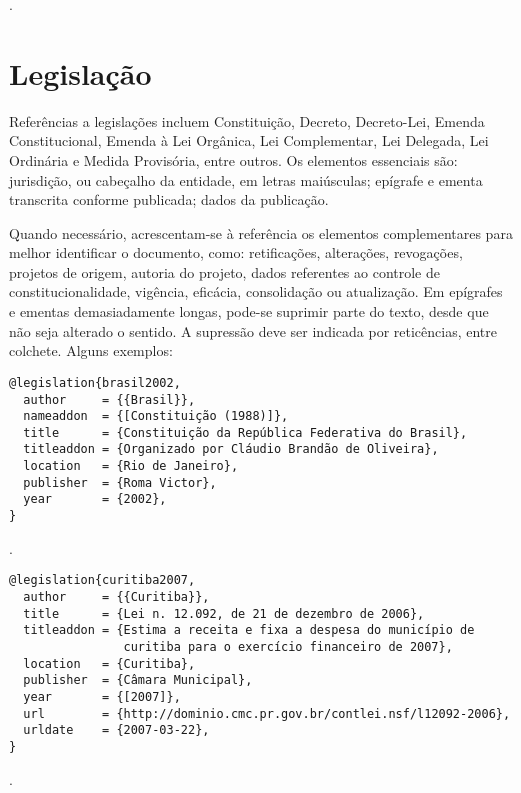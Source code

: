 \noindent
{}.

\section{Legislação}

Referências a legislações incluem Constituição, Decreto, Decreto-Lei, Emenda Constitucional, Emenda à Lei Orgânica, Lei Complementar, Lei Delegada, Lei Ordinária e Medida Provisória, entre outros.
Os elementos essenciais são: jurisdição, ou cabeçalho da entidade, em letras maiúsculas; epígrafe e ementa transcrita conforme publicada; dados da publicação.

Quando necessário, acrescentam-se à referência os elementos complementares para melhor identificar o documento, como: retificações, alterações, revogações, projetos de origem,
autoria do projeto, dados referentes ao controle de constitucionalidade, vigência, eficácia, consolidação ou atualização.
Em epígrafes e ementas demasiadamente longas, pode-se suprimir parte do texto, desde que não seja alterado o sentido. A supressão deve ser indicada por reticências, entre colchete.
Alguns exemplos:

\vspace*{1em}

\begin{Verbatim}[frame=single]
@legislation{brasil2002,
  author     = {{Brasil}},
  nameaddon  = {[Constituição (1988)]},
  title      = {Constituição da República Federativa do Brasil},
  titleaddon = {Organizado por Cláudio Brandão de Oliveira},
  location   = {Rio de Janeiro},
  publisher  = {Roma Victor},
  year       = {2002},
}
\end{Verbatim}

\noindent
{}.

\vspace*{1em}

\begin{Verbatim}[frame=single]
@legislation{curitiba2007,
  author     = {{Curitiba}},
  title      = {Lei n. 12.092, de 21 de dezembro de 2006},
  titleaddon = {Estima a receita e fixa a despesa do município de
                curitiba para o exercício financeiro de 2007},
  location   = {Curitiba},
  publisher  = {Câmara Municipal},
  year       = {[2007]},
  url        = {http://dominio.cmc.pr.gov.br/contlei.nsf/l12092-2006},
  urldate    = {2007-03-22},
}
\end{Verbatim}

\noindent
{}.

